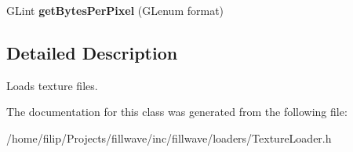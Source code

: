 \begin{DoxyCompactItemize}
\item 
\hypertarget{classfillwave_1_1loader_1_1TextureLoader_ac4ddeabc58cbd56456a6d481f613577c}{}G\+Lint {\bfseries get\+Bytes\+Per\+Pixel} (G\+Lenum format)\label{classfillwave_1_1loader_1_1TextureLoader_ac4ddeabc58cbd56456a6d481f613577c}

\end{DoxyCompactItemize}


\subsection{Detailed Description}
Loads texture files. 

The documentation for this class was generated from the following file\+:\begin{DoxyCompactItemize}
\item 
/home/filip/\+Projects/fillwave/inc/fillwave/loaders/Texture\+Loader.\+h\end{DoxyCompactItemize}
